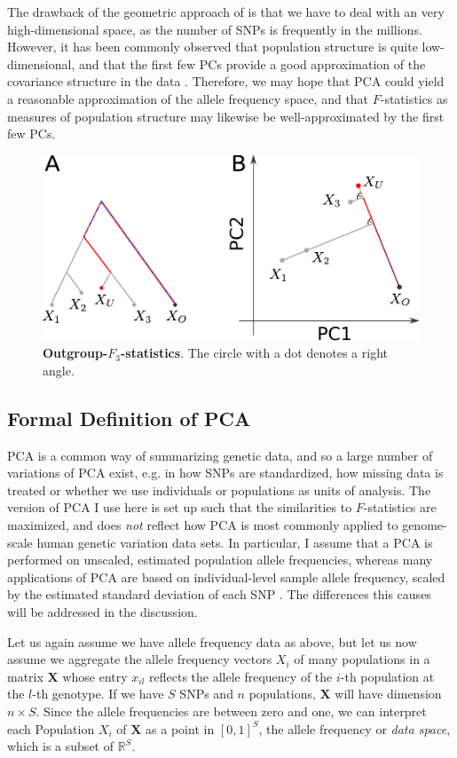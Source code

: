 \documentclass[12pt,fullpage, a4paper]{article}
\newcommand{\MX}{\mathbf{X}} %
\begin{document}
The drawback of the geometric approach of \cite{oteo-garcia2021} is that we have to deal with an very high-dimensional space, as the number of SNPs is frequently in the millions. However, it has been commonly observed that population structure is quite low-dimensional, and that the first few PCs provide a good approximation of the covariance structure in the data \citep{patterson2006}. Therefore, we may hope that PCA could yield a reasonable approximation of the allele frequency space, and that $F$-statistics as measures of population structure may likewise be well-approximated by the first few PCs.



\begin{figure}[!ht]
	\includegraphics[width=.5\textwidth]{figures/outgroup_f3.pdf}
	\caption{\textbf{Outgroup-$F_3$-statistics}. The circle with a dot denotes a right angle.}
	\label{fig:outgroupf3}
\end{figure}


\subsection{Formal Definition of PCA}
PCA is a common way of summarizing genetic data, and so a large number of variations of PCA exist, e.g. in how SNPs are standardized, how missing data is treated or whether we use individuals or populations as units of analysis. The version of PCA I use here is set up such that the similarities to  $F$-statistics are maximized, and does \emph{not} reflect how PCA is most commonly applied to genome-scale human genetic variation data sets. In particular, I assume that a PCA is performed on unscaled, estimated population allele frequencies, whereas many applications of PCA are based on individual-level sample allele frequency, scaled by the estimated standard deviation of each SNP \citep{patterson2006}. The differences this causes will be addressed in the discussion.

Let us again assume we have allele frequency data as above, but let us now assume we aggregate the allele frequency vectors $X_i$ of many populations in a matrix $\MX$ whose entry $x_{il}$ reflects the allele frequency of the $i$-th population at the $l$-th genotype. If we have $S$ SNPs and $n$ populations, $\MX$ will have dimension $n \times S$. Since the allele frequencies are between zero and one, we can interpret each Population $X_i$
of $\MX$ as a point in $[0, 1]^S$, the allele frequency or \emph{data space}, which is a subset of $\mathbb{R}^S$.
	
\end{document}
